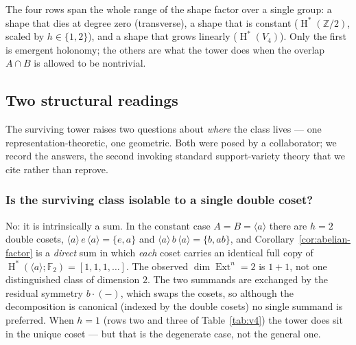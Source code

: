 \documentclass[11pt]{amsart}
\theoremstyle{plain}
\theoremstyle{definition}
\DeclareMathOperator{\Ext}{Ext}
\DeclareMathOperator{\Hh}{H}
\begin{document}
The four rows span the whole range of the shape factor over a single group: a shape that
dies at degree zero (transverse), a shape that is constant ($\Hh^*(\mathbb{Z}/2)$, scaled by
$h\in\{1,2\}$), and a shape that grows linearly ($\Hh^*(V_4)$). Only the first is emergent
holonomy; the others are what the tower does when the overlap $A\cap B$ is allowed to be
nontrivial.

\subsection{Two structural readings}
The surviving tower raises two questions about \emph{where} the class lives --- one
representation-theoretic, one geometric. Both were posed by a collaborator; we record the
answers, the second invoking standard support-variety theory that we cite rather than
reprove.

\subsubsection*{Is the surviving class isolable to a single double coset?}
No: it is intrinsically a sum. In the constant case $A=B=\langle a\rangle$ there are $h=2$
double cosets, $\langle a\rangle\, e\,\langle a\rangle=\{e,a\}$ and
$\langle a\rangle\, b\,\langle a\rangle=\{b,ab\}$, and Corollary~\ref{cor:abelian-factor} is
a \emph{direct} sum in which \emph{each} coset carries an identical full copy of
$\Hh^*(\langle a\rangle;\mathbb{F}_2)=[1,1,1,\dots]$. The observed $\dim\Ext^n=2$ is $1+1$,
not one distinguished class of dimension $2$. The two summands are exchanged by the residual
symmetry $b\cdot(-)$, which swaps the cosets, so although the decomposition is canonical
(indexed by the double cosets) no single summand is preferred. When $h=1$ (rows two and
three of Table~\ref{tab:v4}) the tower does sit in the unique coset --- but that is the
degenerate case, not the general one.
\end{document}
